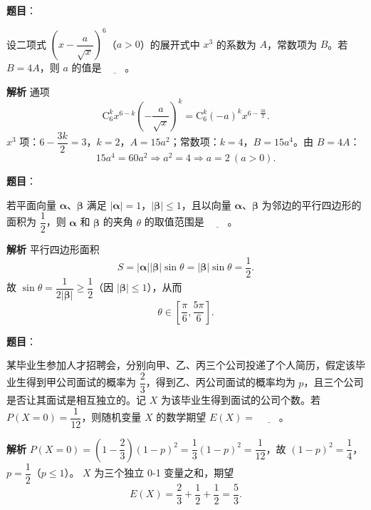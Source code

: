 \begin{answer}

\textbf{题目}：

设二项式 $\left(x-\dfrac{a}{\sqrt x}\right)^6$（$a>0$）的展开式中 $x^3$ 的系数为 $A$，常数项为 $B$。若 $B=4A$，则 $a$ 的值是 $\underline{\qquad}$。

\textbf{解析}
通项
\nopagebreak[4]
\[\mathrm C_6^k x^{6-k}\left(-\frac a{\sqrt x}\right)^k=\mathrm C_6^k(-a)^k x^{6-\frac{3k}2}.\]
$x^3$ 项：$6-\dfrac{3k}2=3$，$k=2$，$A=15a^2$；常数项：$k=4$，$B=15a^4$。由 $B=4A$：
\nopagebreak[4]
\[15a^4=60a^2\Longrightarrow a^2=4\Longrightarrow a=2\ (a>0).\]


\end{answer}
\begin{answer}

\textbf{题目}：

若平面向量 $\boldsymbol\alpha$、$\boldsymbol\beta$ 满足 $|\boldsymbol\alpha|=1$，$|\boldsymbol\beta|\leqslant1$，且以向量 $\boldsymbol\alpha$、$\boldsymbol\beta$ 为邻边的平行四边形的面积为 $\dfrac12$，则 $\boldsymbol\alpha$ 和 $\boldsymbol\beta$ 的夹角 $\theta$ 的取值范围是 $\underline{\qquad}$。

\textbf{解析}
平行四边形面积
\nopagebreak[4]
\[S=|\boldsymbol\alpha||\boldsymbol\beta|\sin\theta=|\boldsymbol\beta|\sin\theta=\frac12.\]
故 $\sin\theta=\dfrac1{2|\boldsymbol\beta|}\geqslant\dfrac12$（因 $|\boldsymbol\beta|\leqslant1$），从而
\nopagebreak[4]
\[\theta\in\left[\frac\pi6,\frac{5\pi}6\right].\]


\end{answer}
\begin{answer}

\textbf{题目}：

某毕业生参加人才招聘会，分别向甲、乙、丙三个公司投递了个人简历，假定该毕业生得到甲公司面试的概率为 $\dfrac23$，得到乙、丙公司面试的概率均为 $p$，且三个公司是否让其面试是相互独立的。记 $X$ 为该毕业生得到面试的公司个数。若 $P(X=0)=\dfrac1{12}$，则随机变量 $X$ 的数学期望 $E(X)=$ $\underline{\qquad}$。

\textbf{解析}
$P(X=0)=\left(1-\dfrac23\right)(1-p)^2=\dfrac13(1-p)^2=\dfrac1{12}$，故 $(1-p)^2=\dfrac14$，$p=\dfrac12$（$p\leqslant1$）。
$X$ 为三个独立 0-1 变量之和，期望
\nopagebreak[4]
\[E(X)=\frac23+\frac12+\frac12=\frac53.\]


\end{answer}
